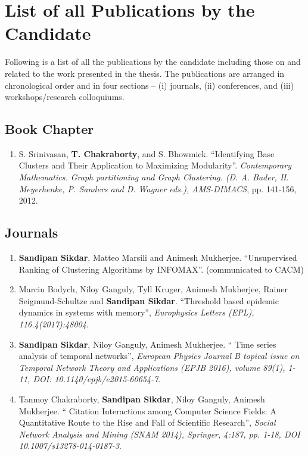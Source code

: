 \clearpage

\thispagestyle{empty}



\chapter[Appendix]{List of all Publications by the Candidate} 



Following is a list of all the publications by the candidate including those on and related to the work presented in the thesis. The
publications are arranged in chronological order and in four sections -- (i) journals, (ii)
conferences, and (iii) workshops/research colloquiums.

\section*{Book Chapter}
\begin{enumerate}

 \item S. Srinivasan, {\bf T. Chakraborty}, and S. Bhowmick. ``Identifying Base Clusters and Their Application to Maximizing
Modularity''. {\it Contemporary Mathematics. Graph partitioning and Graph Clustering. (D. A. Bader, H. Meyerhenke, P. Sanders and D. Wagner
eds.), AMS-DIMACS}, pp. 141-156, 2012.

\end{enumerate}
\fi


\section*{Journals}
\begin{enumerate}
\item  {\bf Sandipan Sikdar}, Matteo Marsili and Animesh Mukherjee. ``Unsupervised Ranking of Clustering Algorithms by INFOMAX''. (communicated to CACM)

\item  Marcin Bodych, Niloy Ganguly, Tyll Kruger, Animesh Mukherjee, Rainer Seigmund-Schultze and {\bf Sandipan Sikdar}. ``Threshold based epidemic dynamics in systems with memory'', {\em Europhysics Letters (EPL), 116.4(2017):48004}.

\item  {\bf Sandipan Sikdar}, Niloy Ganguly, Animesh Mukherjee. `` Time series analysis of temporal networks'', {\em  European Physics Journal B topical issue on  Temporal Network Theory and Applications (EPJB 2016), volume 89(1), 1-11, DOI: 10.1140/epjb/e2015-60654-7}.

\item  Tanmoy Chakraborty, {\bf Sandipan Sikdar}, Niloy Ganguly, Animesh Mukherjee. `` Citation Interactions among Computer Science Fields: A Quantitative Route to the Rise and Fall of Scientific Research'', {\em Social Network Analysis and Mining 
(SNAM 2014), Springer, 4:187, pp. 1-18, DOI 10.1007/s13278-014-0187-3}.

\end{enumerate}

